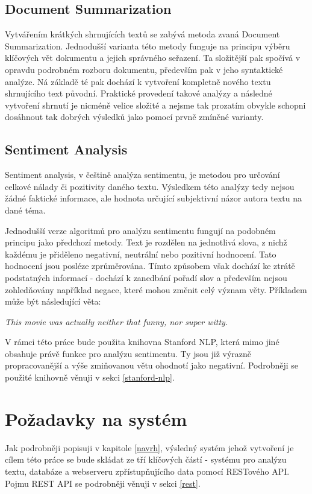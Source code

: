\documentclass[thesis=B,czech]{FITthesis}[2012/06/26]
\begin{document}
\subsection{Document Summarization}
	Vytvářením krátkých shrnujících textů se zabývá metoda zvaná Document Summarization. Jednodušší varianta této metody funguje na principu výběru klíčových vět dokumentu a jejich správného seřazení. Ta složitější pak spočívá v opravdu podrobném rozboru dokumentu, především pak v jeho syntaktické analýze. Ná základě té pak dochází k vytvoření kompletně nového textu shrnujícího text původní. Praktické provedení takové analýzy a následné vytvoření shrnutí je nicméně velice složité a nejsme tak prozatím obvykle schopni dosáhnout tak dobrých výsledků jako pomocí prvně zmíněné varianty\cite{aaaa}. 


\subsection{Sentiment Analysis}
\label{sentiment-analysis}
	Sentiment analysis, v češtině analýza sentimentu, je metodou pro určování celkové nálady či pozitivity daného textu. Výsledkem této analýzy tedy nejsou žádné faktické informace, ale hodnota určující subjektivní názor autora textu na dané téma. 
	
	Jednodušší verze algoritmů pro analýzu sentimentu fungují na podobném principu jako předchozí metody. Text je rozdělen na jednotlivá slova, z nichž každému je přiděleno negativní, neutrální nebo pozitivní hodnocení. Tato hodnocení jsou posléze zprůměrována. Tímto způsobem však dochází ke ztrátě podstatných informací - dochází k zanedbání pořadí slov a především nejsou zohledňovány například negace, které mohou změnit celý význam věty. Příkladem může být následující věta:

\vspace{\baselineskip}
\textit{This movie was actually neither that funny, nor super witty.}	
\vspace{\baselineskip}

	V rámci této práce bude použita knihovna Stanford NLP\cite{sssss}, která mimo jiné obsahuje právě funkce pro analýzu sentimentu. Ty jsou již výrazně propracovanější a výše zmiňovanou větu ohodnotí jako negativní. Podrobněji se použité knihovně věnuji v sekci \ref{stanford-nlp}.


\section{Požadavky na systém}
	Jak podrobněji popisuji v kapitole \ref{navrh}, výsledný systém jehož vytvoření je cílem této práce se bude skládat ze tří klíčových částí - systému pro analýzu textu, databáze a webserveru zpřístupňujícího data pomocí RESTového API. Pojmu REST API se podrobněji věnuji v sekci \ref{rest}. 
	
\end{document}
